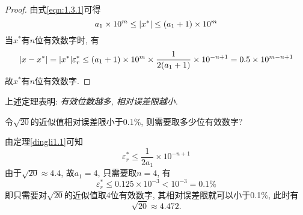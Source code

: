 \begin{proof}
    由式\ref{eqn:1.3.1}可得
    \begin{equation*}
        a_1\times10^m\le\abs{x^*}\le(a_1+1)\times10^m
    \end{equation*}
    当$x^*$有$n$位有效数字时, 有
    \begin{equation*}
        \abs{x-x^*}=\abs{x^*}\varepsilon_r^*\le(a_1+1)\times10^m\times\frac{1}{2(a_1+1)}\times10^{-n+1}=0.5\times10^{m-n+1}
    \end{equation*}
    故$x^*$有$n$位有效数字.
\end{proof}

上述定理表明: \emph{有效位数越多, 相对误差限越小}.

\begin{example}
    令$\sqrt{20}$的近似值相对误差限小于0.1\%, 则需要取多少位有效数字?
\end{example}
\begin{solution}
    由定理\ref{dingli1.1}可知
    \begin{equation*}
        \varepsilon_r^*\le\frac{1}{2a_1}\times10^{-n+1}
    \end{equation*}
    由于$\sqrt{20}\approx4.4$, 故$a_1=4$, 只需要取$n=4$, 有
    \begin{equation*}
        \varepsilon_r^*\le0.125\times10^{-3}<10^{-3}=0.1\%
    \end{equation*}
    即只需要对$\sqrt{20}$的近似值取4位有效数字, 其相对误差限就可以小于0.1\%, 此时有
    \begin{equation*}
        \sqrt{20}\approx4.472.
    \end{equation*}
\end{solution}